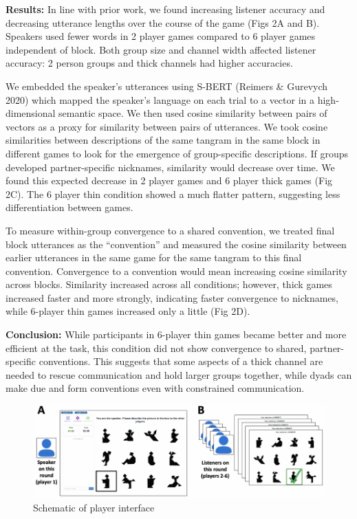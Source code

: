 \documentclass[11pt,a4paper]{article}
\begin{document}

\textbf{Results:} In line with prior work, we found increasing listener accuracy and decreasing utterance lengths over the course of the game (Figs 2A and B). Speakers used fewer words in 2 player games compared to 6 player games independent of block. Both group size and channel width affected listener accuracy: 2 person groups and thick channels had higher accuracies. 

We embedded the speaker's utterances using S-BERT (Reimers \& Gurevych 2020) which mapped the speaker's language on each trial to a vector in a high-dimensional semantic space. We then used cosine similarity between pairs of vectors as a proxy for similarity between pairs of utterances. We took cosine similarities between descriptions of the same tangram in the same block in different games to look for the emergence of group-specific descriptions. If groups developed partner-specific nicknames, similarity would decrease over time. We found this expected decrease in 2 player games and 6 player thick games (Fig 2C). The 6 player thin condition showed a much flatter pattern, suggesting less differentiation between games. 

To measure within-group convergence to a shared convention, we treated final block utterances as the ``convention'' and measured the cosine similarity between earlier utterances in the same game for the same tangram to this final convention. Convergence to a convention would mean increasing cosine similarity across blocks. Similarity increased across all conditions; however, thick games increased faster and more strongly, indicating faster convergence to nicknames, while 6-player thin games increased only a little (Fig 2D). 

\textbf{Conclusion:} While participants in 6-player thin games became better and more efficient at the task, this condition did not show convergence to shared, partner-specific conventions. This suggests that some aspects of a thick channel are needed to rescue communication and hold larger groups together, while dyads can make due and form conventions even with constrained communication. 

\newpage

\begin{figure}
	\includegraphics[width=\textwidth]{../images/interface-1.pdf}
	\caption{Schematic of player interface}
\end{figure}
\end{document}
